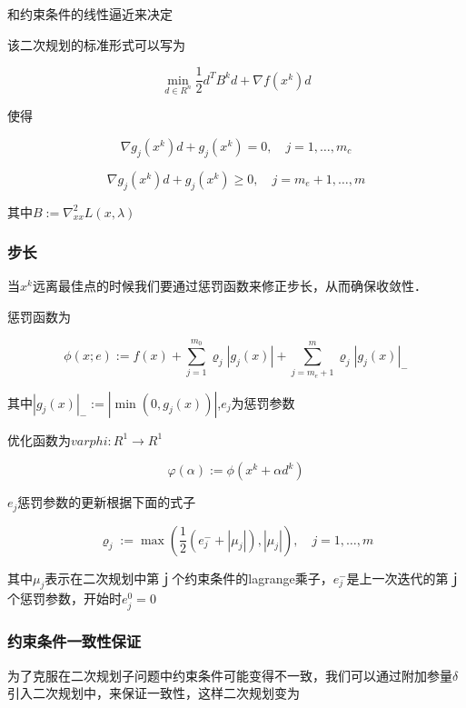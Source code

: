 \documentclass{article}
\begin{document}
和约束条件的线性逼近来决定

该二次规划的标准形式可以写为

\begin{equation}
\min _{d \in R^{n}} \frac{1}{2} d^{T} B^{k} d+\nabla f\left(x^{k}\right) d
\end{equation}

使得

\begin{equation}
\nabla g_{j}\left(x^{k}\right) d+g_{j}\left(x^{k}\right)=0, \quad j=1, \ldots, m_{c}
\end{equation}

\begin{equation}\nabla g_{j}\left(x^{k}\right) d+g_{j}\left(x^{k}\right) \geq 0, \quad j=m_{e}+1, \ldots, m
\end{equation}

其中$B:=\nabla_{x x}^{2} L(x, \lambda)$

\subsubsection{步长}
当$x^k$远离最佳点的时候我们要通过惩罚函数来修正步长，从而确保收敛性．

惩罚函数为

\begin{equation}
\phi(x ; e):=f(x)+\sum_{j=1}^{m_{0}} \varrho_{j}\left|g_{j}(x)\right|+\sum_{j=m_{e}+1}^{m} \varrho_{j}\left|g_{j}(x)\right|_{-}
\end{equation}

其中$\left|g_{j}(x)\right|_{-}:=\left|\min (0, g_{j}(x)) \right|$,$e_j$为惩罚参数

优化函数为$varphi : R^1 \rightarrow R^1$

\begin{equation}
\varphi(\alpha):=\phi\left(x^{k}+\alpha d^{k}\right)
\end{equation}

$e_j$惩罚参数的更新根据下面的式子

\begin{equation}\label{1}
\varrho_{j}:=\max \left(\frac{1}{2}\left(e_{j}^{-}+\left|\mu_{j}\right|\right),\left|\mu_{j}\right|\right), \quad j=1, \ldots, m
\end{equation}

其中$\mu_{j}$表示在二次规划中第ｊ个约束条件的lagrange乘子，$e_{j}^{-}$是上一次迭代的第ｊ个惩罚参数，开始时$e^0_j=0$



\subsubsection{约束条件一致性保证}
为了克服在二次规划子问题中约束条件可能变得不一致，我们可以通过附加参量$\delta$引入二次规划中，来保证一致性，这样二次规划变为
\end{document}
